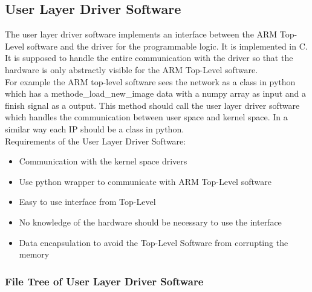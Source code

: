 \subsection{User Layer Driver Software}
The user layer driver software implements an interface between the ARM Top-Level software and the driver for the programmable logic. It is implemented in C. It is supposed to handle the entire communication with the driver so that the hardware is only abstractly visible for the ARM Top-Level software.\\
For example the ARM top-level software sees the network as a class in python which has a methode\_load\_new\_image data with a numpy array as input and a finish signal as a output. This method should call the user layer driver software which handles the communication between user space and kernel space. In a similar way each IP should be a class in python. \\
Requirements of the User Layer Driver Software:
\begin{itemize} 
	\item Communication with the kernel space drivers 
	\item Use python wrapper to communicate with ARM Top-Level software
	\item Easy to use interface from Top-Level 
	\item No knowledge of the hardware should be necessary to use the interface
	\item Data encapsulation to avoid the Top-Level Software from corrupting the memory 
\end{itemize}

\subsubsection{File Tree of User Layer Driver Software} 
